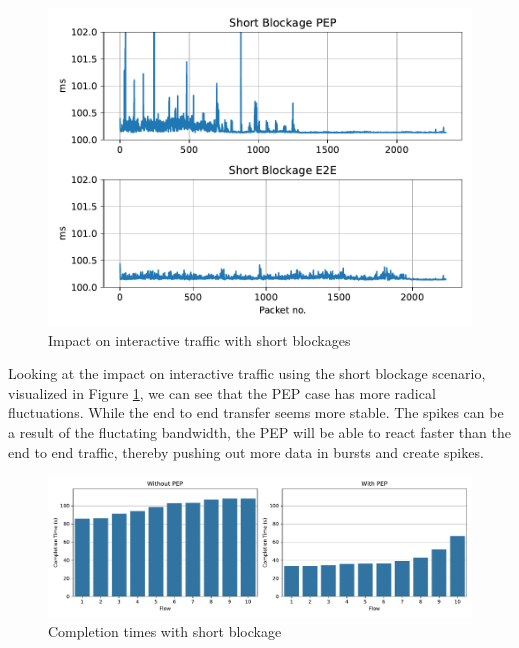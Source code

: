 \documentclass[a4paper,english, 11pt]{report}
\begin{document}
\begin{figure}[h!] %
	\centering
	\includegraphics[scale=0.50]{../diagrams/witestlab/shortblockage.pdf}
  	\caption{Impact on interactive traffic with short blockages}
  	\label{fig:sb_ultra}
\end{figure}

Looking at the impact on interactive traffic using the short blockage scenario, visualized in Figure \ref{fig:sb_ultra}, we can see that the PEP case has more radical fluctuations. While the end to end transfer seems more stable. The spikes can be a result of the fluctating bandwidth, the PEP will be able to react faster than the end to end traffic, thereby pushing out more data in bursts and create spikes.

%

\begin{figure}[h!] %
	\centering
	\includegraphics[scale=0.40]{../diagrams/witestlab/sb_cubic_bar.pdf}
  	\caption{Completion times with short blockage}
  	\label{fig:witestlab_sb_fcts}
\end{figure}
\end{document}
